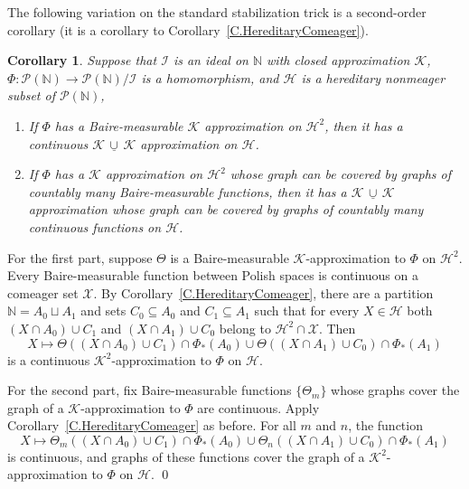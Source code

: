 \documentclass{amsart}
\makeatletter
\newtheorem{coro}[proposition]{Corollary}
\theoremstyle{definition}
\theoremstyle{remark}
\newcommand{\ucup}{\,\underline{\cup}\,}
\newcommand{\cK}{{\mathcal K}}
\renewcommand{\proofname}{Proof}
\renewenvironment{proof}[1][\proofname]{\par
\let\oldqedsymbol\qedsymbol             %
  \normalfont
  \topsep6\p@\@plus6\p@ \trivlist
  \item[\hskip\labelsep\hskip\parindent\scshape
    #1\@addpunct{.}]\ignorespaces
}{%
  \qed\endtrivlist
\global\let\qedsymbol\oldqedsymbol      %
}
\newcommand{\cP}{\mathcal P}
\newcommand{\bbN}{\mathbb N}
\newcommand{\cI}{{\mathcal I}} %
\newcommand{\cX}{\mathcal X}
\newcommand{\calH}{\mathcal H}
\newcommand{\cPN}{\cP(\bbN)}
\numberwithin{claim}{subsection}
\makeatother
\begin{document}
The following variation on the standard stabilization trick is a second-order corollary (it is a corollary to Corollary~\ref{C.HereditaryComeager}). 

\begin{coro}\label{C.Stabilization}   Suppose that $\cI$ is an ideal on $\bbN$ with closed approximation $\cK$, $\Phi\colon \cP(\bbN)\to \cP(\bbN)/\cI$ is a homomorphism, and $\calH$ is a hereditary nonmeager subset of $\cPN$, 
	\begin{enumerate}
		\item 	If  $\Phi$ has a Baire-measurable $\cK$ approximation on $\calH^2$, then it has a continuous $\cK\ucup \cK$ approximation on $\calH$. 
		\item 	If  $\Phi$ has a $\cK$ approximation on $\calH^2$ whose graph can be covered by graphs of countably many Baire-measurable functions, then it has a $\cK\ucup \cK$ approximation whose graph can be covered by graphs of countably many continuous functions on $\calH$. 
	\end{enumerate}
\end{coro}

\begin{proof}
	For the first part, suppose $\Theta$ is a Baire-measurable $\cK$-approximation to $\Phi$ on $\calH^2$. 
	Every Baire-measurable function between Polish spaces is continuous on a comeager set $\cX$. By Corollary~\ref{C.HereditaryComeager},
	there are a partition $\bbN=A_0\sqcup A_1$ and sets $C_0\subseteq A_0$ and $C_1\subseteq A_1$ such that for every $X\in \calH$ both $(X\cap A_0)\cup C_1$ and $(X\cap A_1)\cup C_0$ belong to $\calH^2\cap \cX$. 
	Then 
	\[
	X\mapsto \Theta((X\cap A_0)\cup C_1)\cap \Phi_*(A_0)\cup \Theta((X\cap A_1)\cup C_0)\cap \Phi_*(A_1) 
	\]
	is a continuous $\cK^2$-approximation to $\Phi$ on $\calH$. 
	
	For the second part, fix  Baire-measurable functions $\{\Theta_m\}$ whose graphs cover the graph of a $\cK$-approximation to $\Phi$ are continuous. Apply Corollary~\ref{C.HereditaryComeager} as before. For all $m$ and $n$, the function  
	\[
	X\mapsto \Theta_m((X\cap A_0)\cup C_1)\cap \Phi_*(A_0)\cup \Theta_n((X\cap A_1)\cup C_0)\cap \Phi_*(A_1) 
	\]
	is continuous, and graphs of these functions cover the graph of a $\cK^2$-approximation to $\Phi$ on $\calH$. 
\end{proof}
\end{document}
